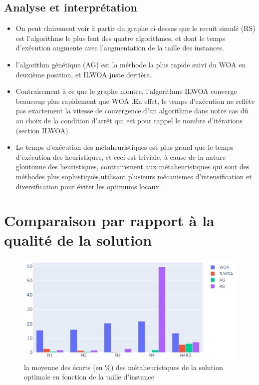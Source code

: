 \documentclass[12pt]{article}
\begin{document}
        \subsection{Analyse et interprétation}
            \begin{itemize}
                \item On peut clairement voir à partir du  graphe ci-dessus que le recuit simulé (RS) est l’algorithme le plus lent des quatre algorithmes, et dont le temps d'exécution augmente avec l’augmentation de la taille des instances. 
                \item l’algorithm génétique (AG)  est la méthode la plus rapide suivi du WOA en deuxième position, et ILWOA juste derrière.
                \item Contrairement à ce que le graphe montre, l’algorithme ILWOA converge beaucoup plus rapidement que WOA .En effet, le temps d'exécution ne reflète pas exactement la vitesse de convergence d’un algorithme dans notre cas dû au choix de la condition d'arrêt qui est pour rappel le nombre d'itérations (section ILWOA).
                \item Le temps d'exécution des métaheuristiques est plus grand que le temps d'exécution des heuristiques, et ceci est triviale, à cause de la nature gloutonne des heuristiques, contrairement aux métaheuristiques qui sont des méthodes plus sophistiqués,utilisant plusieurs mécanismes d’intensification et diversification pour éviter les optimums locaux.
            \end{itemize}
    \section{Comparaison par rapport à la qualité de la solution}
        \begin{figure}[H]
            \includegraphics[width=\linewidth]{../figures/mh_ecart.png}
            \caption{la moyenne des écarts (en \%) des métaheuristiques de la solution optimale en fonction de la taille d'instance}
        \end{figure}
\end{document}
